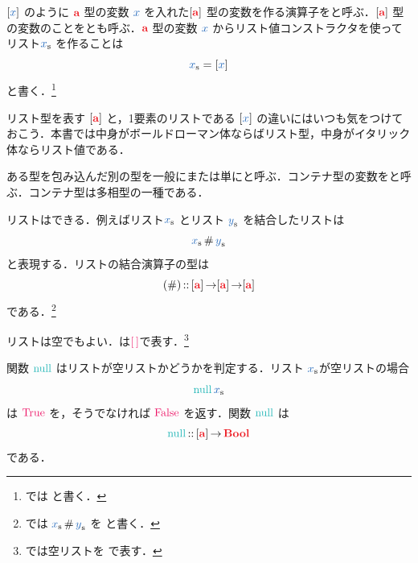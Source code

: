 \documentclass[a5paper,twoside,fleqn,draft]{jsbook}
\begin{document}
$\hListWith{\hVar{x}}$ のように $\hTypeName{a}$ 型の変数 $\hVar{x}$ を入れた$\hListConstruct{\hTypeName{a}}$ 型の変数を作る演算子をと呼ぶ．$\hListConstruct{\hTypeName{a}}$ 型の変数のことをとも呼ぶ．$\hTypeName{a}$ 型の変数 $\hVar{x}$ からリスト値コンストラクタを使ってリスト$\hListVar{x}$ を作ることは
\begin{equation}
  \hListVar{x}
  =\hListWith{\hVar{x}}
\end{equation}
と書く．\footnote{\haskell では  と書く．}

リスト型を表す $\hListConstruct{\hTypeName{a}}$ と，1要素のリストである $\hListWith{\hVar{x}}$ の違いにはいつも気をつけておこう．本書では中身がボールドローマン体ならばリスト型，中身がイタリック体ならリスト値である．

ある型を包み込んだ別の型を一般にまたは単にと呼ぶ．コンテナ型の変数をと呼ぶ．コンテナ型は多相型の一種である．


\separator

リストはできる．例えばリスト$\hListVar{x}$ とリスト
$\hListVar{y}$ を結合したリストは
\begin{equation}
  \hListVar{x}\hAppend\hListVar{y}
\end{equation}
と表現する．リストの結合演算子の型は
\begin{equation}
  (\hAppend)
  \hIsTypeOf{}\hListConstruct{\hTypeName{a}}\hFunctionArrow\hListConstruct{\hTypeName{a}}\hFunctionArrow\hListConstruct{\hTypeName{a}}
\end{equation}
である．\footnote{\haskell では $\hListVar{x}\hAppend\hListVar{y}$ を  と書く．}

\separator

リストは空でもよい．は${\hEmptyList}$で表す．\footnote{\haskell では空リストを \code{[]} で表す．}

関数 $\hNull$ はリストが空リストかどうかを判定する．リスト $\hListVar{x}$が空リストの場合
\begin{equation}
  \hNull\hListVar{x}
\end{equation}
は $\hTrue$ を，そうでなければ $\hFalse$ を返す．関数 $\hNull$ は
\begin{equation}
\hNull\hIsTypeOf{}\hListConstruct{\hTypeName{a}}\hFunctionArrow\hBool
\end{equation}
である．
\end{document}
